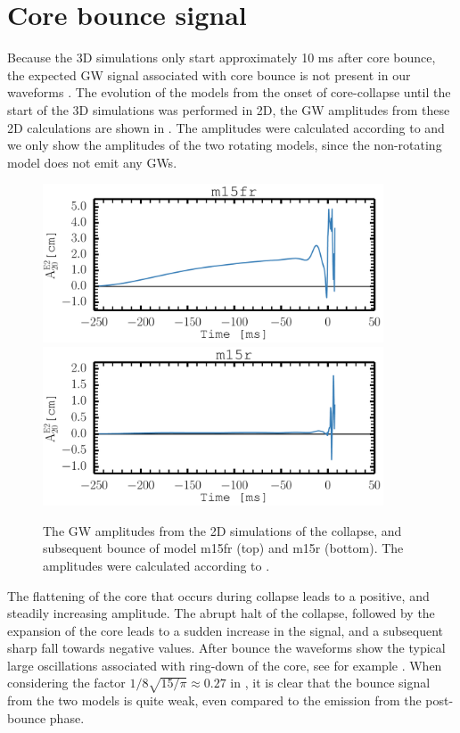 \section{Core bounce signal}
{\comment
Because the 3D simulations only start approximately 10 ms after core bounce, the
expected GW signal associated with core bounce is not present in our waveforms .
The evolution of the models from the onset of core-collapse until the start of the 3D simulations
was performed in 2D, the GW amplitudes from these 2D calculations are shown in .
The amplitudes were calculated according to  and we only show the amplitudes of the two
rotating models, since the non-rotating model does not emit any GWs.
\begin{figure}[ht]         
\centering                            
\includegraphics[width=0.9\textwidth]{./images/paper2/bounce_fr.pdf} \\
\includegraphics[width=0.9\textwidth]{./images/paper2/bounce_r.pdf}
\caption{The GW amplitudes from the 2D simulations of the collapse, and subsequent bounce
of model m15fr (top) and m15r (bottom). The amplitudes were calculated according to .
\label{figp2:bounce}}
\end{figure}
The flattening of the core that occurs during collapse leads to a positive, and steadily increasing
amplitude. The abrupt halt of the collapse, followed by the expansion of the core leads to a sudden 
increase in the signal, and a subsequent sharp fall towards negative values. After bounce the waveforms show
the typical large oscillations associated with ring-down of the core, see for example 
\cite{mueller_82,finn_90,moenchmeyer_91,yamada_95,zwerger_97}.
When considering the factor ${1}/{8}\sqrt{15/\pi} \approx 0.27$ in , it is clear that
the bounce signal from the two models is quite weak, even compared to the emission from the post-bounce phase.}

